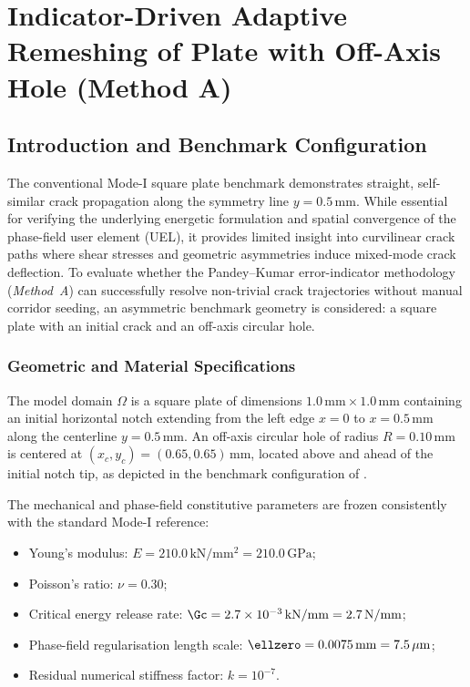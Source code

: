 \chapter{Indicator-Driven Adaptive Remeshing of Plate with Off-Axis Hole (Method A)}
\label{cha:method_a_hole}

\section{Introduction and Benchmark Configuration}
\label{sec:hole_introduction}

The conventional Mode-I square plate benchmark demonstrates straight, self-similar crack propagation along the symmetry line $y = 0.5\,\mathrm{mm}$. While essential for verifying the underlying energetic formulation and spatial convergence of the phase-field user element (UEL), it provides limited insight into curvilinear crack paths where shear stresses and geometric asymmetries induce mixed-mode crack deflection. To evaluate whether the Pandey--Kumar error-indicator methodology (\emph{Method~A}) can successfully resolve non-trivial crack trajectories without manual corridor seeding, an asymmetric benchmark geometry is considered: a square plate with an initial crack and an off-axis circular hole.

\subsection{Geometric and Material Specifications}
\label{subsec:hole_geometry}

The model domain $\Omega$ is a square plate of dimensions $1.0\,\mathrm{mm} \times 1.0\,\mathrm{mm}$ containing an initial horizontal notch extending from the left edge $x = 0$ to $x = 0.5\,\mathrm{mm}$ along the centerline $y = 0.5\,\mathrm{mm}$. An off-axis circular hole of radius $R = 0.10\,\mathrm{mm}$ is centered at $(x_c, y_c) = (0.65, 0.65)\,\mathrm{mm}$, located above and ahead of the initial notch tip, as depicted in the benchmark configuration of \citet{pandey2025}. 

The mechanical and phase-field constitutive parameters are frozen consistently with the standard Mode-I reference:
\begin{itemize}
  \item Young's modulus: $E = 210.0\,\mathrm{kN/mm^2} = 210.0\,\mathrm{GPa}$;
  \item Poisson's ratio: $\nu = 0.30$;
  \item Critical energy release rate: $\Gc = 2.7 \times 10^{-3}\,\mathrm{kN/mm} = 2.7\,\mathrm{N/mm}$;
  \item Phase-field regularisation length scale: $\ellzero = 0.0075\,\mathrm{mm} = 7.5\,\mu\mathrm{m}$;
  \item Residual numerical stiffness factor: $k = 10^{-7}$.
\end{itemize}

